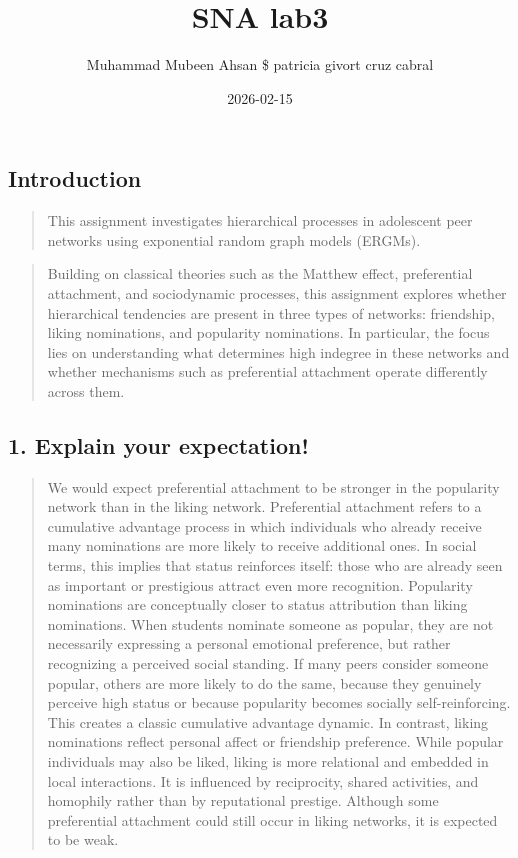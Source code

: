 \documentclass[
  letterpaper,
  DIV=11,
  numbers=noendperiod]{scrartcl}
\title{SNA lab3}
\author{Muhammad Mubeen Ahsan \$ patricia givort cruz cabral}
\date{2026-02-15}
\renewcommand*\contentsname{Table of contents}
\newcommand\contentsname{Table of contents}
\begin{document}
\maketitle

\renewcommand*\contentsname{Table of contents}
{
\hypersetup{linkcolor=}
\setcounter{tocdepth}{2}
\tableofcontents
}

\subsection{Introduction}\label{introduction}

\begin{quote}
This assignment investigates hierarchical processes in adolescent peer
networks using exponential random graph models (ERGMs).
\end{quote}

\begin{quote}
Building on classical theories such as the Matthew effect, preferential
attachment, and sociodynamic processes, this assignment explores whether
hierarchical tendencies are present in three types of networks:
friendship, liking nominations, and popularity nominations. In
particular, the focus lies on understanding what determines high
indegree in these networks and whether mechanisms such as preferential
attachment operate differently across them.
\end{quote}

\subsection{1. Explain your
expectation!}\label{explain-your-expectation}

\begin{quote}
We would expect preferential attachment to be stronger in the popularity
network than in the liking network. Preferential attachment refers to a
cumulative advantage process in which individuals who already receive
many nominations are more likely to receive additional ones. In social
terms, this implies that status reinforces itself: those who are already
seen as important or prestigious attract even more recognition.
Popularity nominations are conceptually closer to status attribution
than liking nominations. When students nominate someone as popular, they
are not necessarily expressing a personal emotional preference, but
rather recognizing a perceived social standing. If many peers consider
someone popular, others are more likely to do the same, because they
genuinely perceive high status or because popularity becomes socially
self-reinforcing. This creates a classic cumulative advantage dynamic.
In contrast, liking nominations reflect personal affect or friendship
preference. While popular individuals may also be liked, liking is more
relational and embedded in local interactions. It is influenced by
reciprocity, shared activities, and homophily rather than by
reputational prestige. Although some preferential attachment could still
occur in liking networks, it is expected to be weak.
\end{quote}
\end{document}
